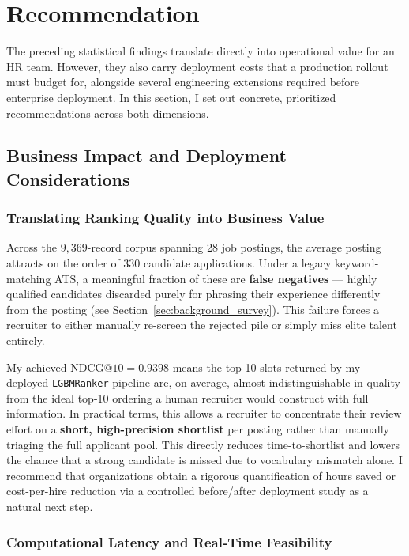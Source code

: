 \chapter{Recommendation}
\label{ch:recommendation}

The preceding statistical findings translate directly into operational value for an HR team. However, they also carry deployment costs that a production rollout must budget for, alongside several engineering extensions required before enterprise deployment. In this section, I set out concrete, prioritized recommendations across both dimensions.

\section{Business Impact and Deployment Considerations}

\subsection{Translating Ranking Quality into Business Value}

Across the $9{,}369$-record corpus spanning 28 job postings, the average posting attracts on the order of 330 candidate applications. Under a legacy keyword-matching ATS, a meaningful fraction of these are \textbf{false negatives} --- highly qualified candidates discarded purely for phrasing their experience differently from the posting (see Section~\ref{sec:background_survey}). This failure forces a recruiter to either manually re-screen the rejected pile or simply miss elite talent entirely.

My achieved \textbf{$\text{NDCG}@10 = 0.9398$} means the top-10 slots returned by my deployed \texttt{LGBMRanker} pipeline are, on average, almost indistinguishable in quality from the ideal top-10 ordering a human recruiter would construct with full information. In practical terms, this allows a recruiter to concentrate their review effort on a \textbf{short, high-precision shortlist} per posting rather than manually triaging the full applicant pool. This directly reduces time-to-shortlist and lowers the chance that a strong candidate is missed due to vocabulary mismatch alone. I recommend that organizations obtain a rigorous quantification of hours saved or cost-per-hire reduction via a controlled before/after deployment study as a natural next step.

\subsection{Computational Latency and Real-Time Feasibility}

